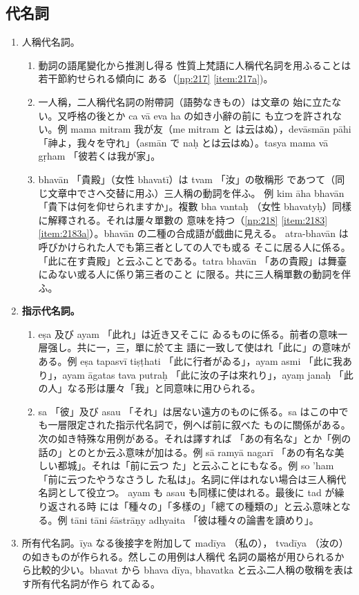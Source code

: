 \subsection{代名詞}
\numberParagraph
\begin{enumerate}[label=(\arabic*)]
\item 人稱代名詞。
\begin{enumerate}[label=(\alph*)]
\item 動詞の語尾變化から推測し得る
性質上梵語に人稱代名詞を用ふることは若干節約せられる傾向に
ある（\ref{np:217} \ref{item:217a})。
\item 一人稱，二人稱代名詞の附帶詞（語勢なきもの）は文章の
始に立たない。又呼格の後とか ca vā eva ha の如き小辭の前に
も立つを許されない。例 mama mitram 我が友（me mitram と
は云はぬ），devāsmān pāhi 「神よ，我々を守れ」（asmān で
naḥ とは云はぬ）。tasya mama vā gṛham 「彼若くは我が家」。
\item bhavān 「貴殿」（女性 bhavatī）は tvam 「汝」の敬稱形
であつて（同じ文章中でさへ交替に用ふ）三人稱の動詞を伴ふ。
例 kim āha bhavān 「貴下は何を仰せられますか」。複數 bha\-%
vantaḥ （女性 bhavatyḥ）同樣に解釋される。それは屢々單數の
意味を持つ（\ref{np:218} \ref{item:2183} \ref{item:2183a}）。bhavān の二種の合成語が戯曲に見える。
atra-bhavān は呼びかけられた人でも第三者としての人でも或る
そこに居る人に係る。「此に在す貴殿」と云ふことである。tatra\-%
bhavān 「あの貴殿」は舞臺にゐない或る人に係り第三者のこと
に限る。共に三人稱單數の動詞を伴ふ。
\end{enumerate}
\item \textbf{指示代名詞。}
\begin{enumerate}[label=(\alph*)]
\item eṣa 及び ayam 「此れ」は近き又そこに
ゐるものに係る。前者の意味一層强し。共に一，三，單に於て主
語に一致して使はれ「此に」の意味がある。例 eṣa tapasvī
tiṣṭhati 「此に行者がゐる」，ayam asmi 「此に我あり」，ayam
āgatas tava putraḥ 「此に汝の子は來れり」，ayaṃ janaḥ 「此
の人」なる形は屢々「我」と同意味に用ひられる。
\item sa 「彼」及び asau 「それ」は居ない遠方のものに係る。sa
はこの中でも一層限定された指示代名詞で，例へば前に叙べた
ものに關係がある。次の如き特殊な用例がある。それは譯すれば
「あの有名な」とか「例の話の」とのとか云ふ意味が加はる。例
sā ramyā nagarī 「あの有名な美しい都城」。それは「前に云つ
た」と云ふことにもなる。例 so 'ham 「前に云つたやうなさうし
た私は」。名詞に伴はれない場合は三人稱代名詞として役立つ。
ayam も asau も同樣に使はれる。最後に tad が繰り返される時
には「種々の」「多樣の」「總ての種類の」と云ふ意味となる。例
tāni tāni śāstrāṇy adhyaita 「彼は種々の論書を讀めり」。
\end{enumerate}
\item 所有代名詞。īya なる後接字を附加して madīya （私の），
tvadīya （汝の）の如きものが作られる。然しこの用例は人稱代
名詞の屬格が用ひられるから比較的少い。bhavat から bhava\-%
dīya, bhavatka と云ふ二人稱の敬稱を表はす所有代名詞が作ら
れてゐる。
\end{enumerate}

